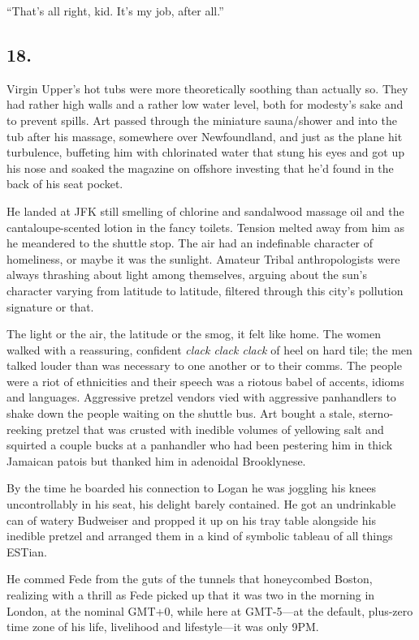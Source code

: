 “That’s all right, kid. It’s my job, after all.”

\subsection{18.}

Virgin Upper’s hot tubs were more theoretically soothing than
actually so. They had rather high walls and a rather low water
level, both for modesty’s sake and to prevent spills. Art passed
through the miniature sauna/shower and into the tub after his
massage, somewhere over Newfoundland, and just as the plane hit
turbulence, buffeting him with chlorinated water that stung his
eyes and got up his nose and soaked the magazine on offshore
investing that he’d found in the back of his seat pocket.

He landed at JFK still smelling of chlorine and sandalwood massage
oil and the cantaloupe-scented lotion in the fancy toilets. Tension
melted away from him as he meandered to the shuttle stop. The air
had an indefinable character of homeliness, or maybe it was the
sunlight. Amateur Tribal anthropologists were always thrashing
about light among themselves, arguing about the sun’s character
varying from latitude to latitude, filtered through this city’s
pollution signature or that.

The light or the air, the latitude or the smog, it felt like home.
The women walked with a reassuring, confident
\emph{clack clack clack} of heel on hard tile; the men talked
louder than was necessary to one another or to their comms. The
people were a riot of ethnicities and their speech was a riotous
babel of accents, idioms and languages. Aggressive pretzel vendors
vied with aggressive panhandlers to shake down the people waiting
on the shuttle bus. Art bought a stale, sterno-reeking pretzel that
was crusted with inedible volumes of yellowing salt and squirted a
couple bucks at a panhandler who had been pestering him in thick
Jamaican patois but thanked him in adenoidal Brooklynese.

By the time he boarded his connection to Logan he was joggling his
knees uncontrollably in his seat, his delight barely contained. He
got an undrinkable can of watery Budweiser and propped it up on his
tray table alongside his inedible pretzel and arranged them in a
kind of symbolic tableau of all things ESTian.

He commed Fede from the guts of the tunnels that honeycombed
Boston, realizing with a thrill as Fede picked up that it was two
in the morning in London, at the nominal GMT+0, while here at
GMT-5—at the default, plus-zero time zone of his life, livelihood
and lifestyle—it was only 9PM.


